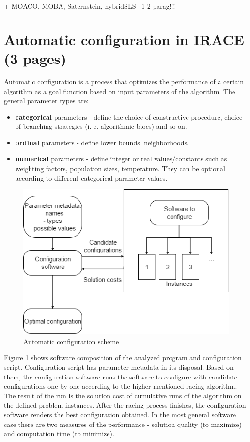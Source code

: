 \documentclass[12pt]{article}
\begin{document}
+ MOACO, MOBA, Saternstein, hybridSLS ~1-2 parag!!!

\section{Automatic configuration in IRACE (3 pages)}

Automatic configuration is a process that optimizes the performance of a certain algorithm as a goal function based on input parameters of the algorithm. The general parameter types are:
 
\begin{itemize}
\item \textbf{categorical} parameters - define the choice of constructive procedure, choice of branching strategies (i. e. algorithmic blocs) and so on.
\item \textbf{ordinal} parameters - define lower bounds, neighborhoods.
\item \textbf{numerical} parameters - define integer or real values/constants such as weighting factors, population sizes, temperature. They can be optional according to different categorical parameter values.
\end{itemize}

\begin{figure}[H]
  \centering
    \includegraphics[scale=0.7]{configuration-top-level.png}
  \caption{Automatic configuration scheme}
  \label{fig:autoconf}
\end{figure}

Figure \ref{fig:autoconf} shows software composition of the analyzed program and configuration script. Configuration script has parameter metadata in its disposal. Based on them, the configuration software runs the software to configure with candidate configurations one by one according to the higher-mentioned racing algorithm. The result of the run is the solution cost of cumulative runs of the algorithm on the defined problem instances. After the racing process finishes, the configuration software renders the best configuration obtained. In the most general software case there are two measures of the performance - solution quality (to maximize) and computation time (to minimize).
\end{document}
